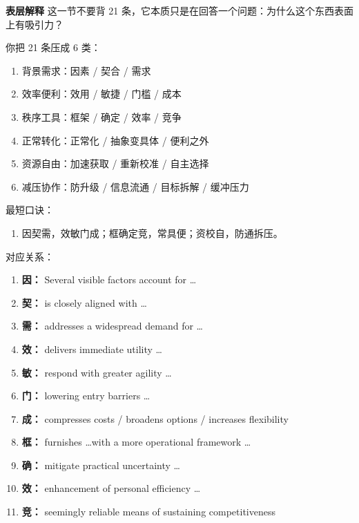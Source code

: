 ﻿\documentclass[lang=cn,11pt]{elegantbook}
\begin{document}
\begin{note}
\textbf{表层解释} 这一节不要背 21 条，它本质只是在回答一个问题：为什么这个东西表面上有吸引力？

你把 21 条压成 6 类：

\begin{enumerate}
  \item 背景需求：因素 / 契合 / 需求
  \item 效率便利：效用 / 敏捷 / 门槛 / 成本
  \item 秩序工具：框架 / 确定 / 效率 / 竞争
  \item 正常转化：正常化 / 抽象变具体 / 便利之外
  \item 资源自由：加速获取 / 重新校准 / 自主选择
  \item 减压协作：防升级 / 信息流通 / 目标拆解 / 缓冲压力
\end{enumerate}

最短口诀：

\begin{enumerate}
  \item 因契需，效敏门成；框确定竞，常具便；资校自，防通拆压。
\end{enumerate}

对应关系：

\begin{enumerate}
  \item \textbf{因：} Several visible factors account for \ldots
  \item \textbf{契：} is closely aligned with \ldots
  \item \textbf{需：} addresses a widespread demand for \ldots

  \item \textbf{效：} delivers immediate utility \ldots
  \item \textbf{敏：} respond with greater agility \ldots
  \item \textbf{门：} lowering entry barriers \ldots
  \item \textbf{成：} compresses costs / broadens options / increases flexibility

  \item \textbf{框：} furnishes \ldots with a more operational framework \ldots
  \item \textbf{确：} mitigate practical uncertainty \ldots
  \item \textbf{效：} enhancement of personal efficiency \ldots
  \item \textbf{竞：} seemingly reliable means of sustaining competitiveness


\end{enumerate}
\end{note}
\end{document}
